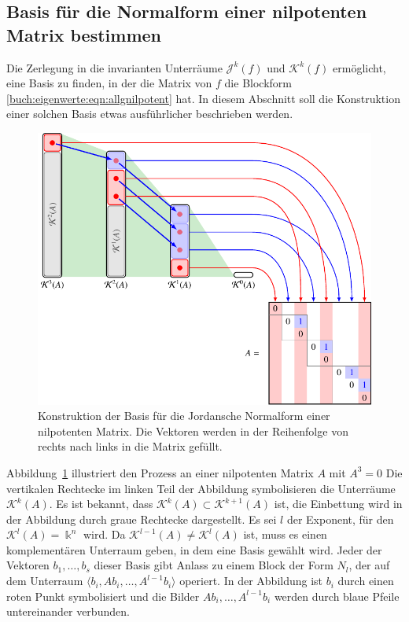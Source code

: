 %
%
\subsection{Basis für die Normalform einer nilpotenten Matrix bestimmen
\label{buch:subsection:normalform-einer-nilpotenten-matrix}}
Die Zerlegung in die invarianten Unterräume $\mathcal{J}^k(f)$ und
$\mathcal{K}^k(f)$ ermöglicht, eine Basis zu finden, in der die
Matrix von $f$ die Blockform \eqref{buch:eigenwerte:eqn:allgnilpotent}
hat.
In diesem Abschnitt soll die Konstruktion einer solchen Basis
etwas ausführlicher beschrieben werden.

\begin{figure}
\centering
\includegraphics{chapters/40-eigenwerte/images/normalform.pdf}
\caption{Konstruktion der Basis für die Jordansche Normalform einer
nilpotenten Matrix.
Die Vektoren werden in der Reihenfolge von rechts nach links in die
Matrix gefüllt.
\label{buch:eigenwerte:fig:normalform}}
\end{figure}

Abbildung~\ref{buch:eigenwerte:fig:normalform} illustriert den Prozess
an einer nilpotenten Matrix $A$ mit $A^3=0$
Die vertikalen Rechtecke im linken Teil der Abbildung symbolisieren
die Unterräume $\mathcal{K}^k(A)$.
Es ist bekannt, dass $\mathcal{K}^k(A) \subset \mathcal{K}^{k+1}(A)$ ist,
die Einbettung wird in der Abbildung durch graue Rechtecke dargestellt.
Es sei $l$ der Exponent, für den $\mathcal{K}^l(A)=\Bbbk^n$ wird.
Da $\mathcal{K}^{l-1}(A)\ne \mathcal{K}^l(A)$ ist, muss es einen
komplementären Unterraum geben, in dem eine Basis gewählt wird.
Jeder der Vektoren $b_1,\dots,b_s$ dieser Basis gibt Anlass zu einem
Block der Form $N_l$, der auf dem Unterraum 
$\langle b_i,Ab_i,\dots,A^{l-1}b_i\rangle$ operiert.
In der Abbildung ist $b_i$ durch einen roten Punkt symbolisiert und
die Bilder $Ab_i,\dots,A^{l-1}b_i$ werden durch blaue Pfeile untereinander
verbunden.

